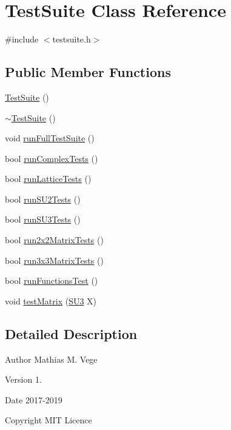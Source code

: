 \hypertarget{class_test_suite}{}\section{Test\+Suite Class Reference}
\label{class_test_suite}


{\ttfamily \#include $<$testsuite.\+h$>$}

\subsection*{Public Member Functions}
\begin{DoxyCompactItemize}
\item 
\mbox{\hyperlink{class_test_suite_af7291e6d8b53443604ee0c1fcf1fadfc}{Test\+Suite}} ()
\item 
\mbox{\hyperlink{class_test_suite_a1a4603e985169c62d251876dd3910b5e}{$\sim$\+Test\+Suite}} ()
\item 
void \mbox{\hyperlink{class_test_suite_a0fa7e788a1b1c235faa475c0d1aaa1e3}{run\+Full\+Test\+Suite}} ()
\item 
bool \mbox{\hyperlink{class_test_suite_a0597dcd7c68390ac33d8095f2a76ae0f}{run\+Complex\+Tests}} ()
\item 
bool \mbox{\hyperlink{class_test_suite_aa24e7ab393007d18d027fe95c5a3ec58}{run\+Lattice\+Tests}} ()
\item 
bool \mbox{\hyperlink{class_test_suite_a904ac34cad4166c281f7dbce9a682b2c}{run\+S\+U2\+Tests}} ()
\item 
bool \mbox{\hyperlink{class_test_suite_a7e884438760a81f7f4da7831043f88b0}{run\+S\+U3\+Tests}} ()
\item 
bool \mbox{\hyperlink{class_test_suite_acf6d1ad1920132a4aed74457bb2df8cb}{run2x2\+Matrix\+Tests}} ()
\item 
bool \mbox{\hyperlink{class_test_suite_a91444c36a86d453cc9922d888b248a6b}{run3x3\+Matrix\+Tests}} ()
\item 
bool \mbox{\hyperlink{class_test_suite_af257c555a7fff6934523f80b9c59309c}{run\+Functions\+Test}} ()
\item 
void \mbox{\hyperlink{class_test_suite_ab5f5915eeeca7674592c8f170948f43d}{test\+Matrix}} (\mbox{\hyperlink{class_s_u3}{S\+U3}} X)
\end{DoxyCompactItemize}


\subsection{Detailed Description}
\begin{DoxyAuthor}{Author}
Mathias M. Vege 
\end{DoxyAuthor}
\begin{DoxyVersion}{Version}
1. 
\end{DoxyVersion}
\begin{DoxyDate}{Date}
2017-\/2019 
\end{DoxyDate}
\begin{DoxyCopyright}{Copyright}
M\+IT Licence 
\end{DoxyCopyright}



